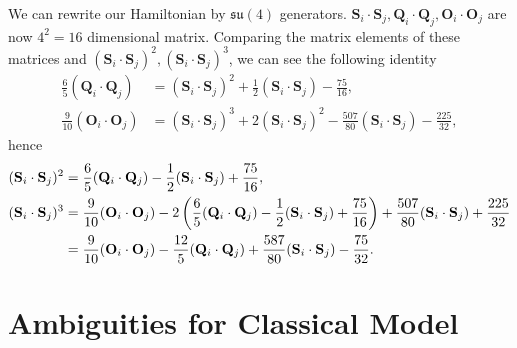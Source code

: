 \documentclass[11pt, aps, longbibliography]{article}
\begin{document}
        We can rewrite our Hamiltonian by $\mathfrak{su}(4)$ generators. $\mathbf{S}_i \cdot \mathbf{S}_j, \mathbf{Q}_i \cdot \mathbf{Q}_j, \mathbf{O}_i \cdot \mathbf{O}_j$ are now $4^2=16$ dimensional matrix. 
        Comparing the matrix elements of these matrices and $(\mathbf{S}_i \cdot \mathbf{S}_j)^2, (\mathbf{S}_i \cdot \mathbf{S}_j)^3$, we can see the following identity
        \begin{align}
            \frac{6}{5}(\mathbf{Q}_i \cdot \mathbf{Q}_j) &= (\mathbf{S}_i \cdot \mathbf{S}_j)^2 + \frac{1}{2}(\mathbf{S}_i \cdot \mathbf{S}_j) - \frac{75}{16}, \\
            \frac{9}{10}(\mathbf{O}_i \cdot \mathbf{O}_j) &= (\mathbf{S}_i \cdot \mathbf{S}_j)^3 + 2(\mathbf{S}_i \cdot \mathbf{S}_j)^2 - \frac{507}{80}(\mathbf{S}_i \cdot \mathbf{S}_j) - \frac{225}{32},
        \end{align}
        hence
        \begin{align}
            (\mathbf{S}_i \cdot \mathbf{S}_j)^2 &= \frac{6}{5}(\mathbf{Q}_i \cdot \mathbf{Q}_j) - \frac{1}{2}(\mathbf{S}_i \cdot \mathbf{S}_j) + \frac{75}{16}, \\
            (\mathbf{S}_i \cdot \mathbf{S}_j)^3 &= \frac{9}{10}(\mathbf{O}_i \cdot \mathbf{O}_j) - 2\left( \frac{6}{5}(\mathbf{Q}_i \cdot \mathbf{Q}_j) - \frac{1}{2}(\mathbf{S}_i \cdot \mathbf{S}_j) + \frac{75}{16} \right) + \frac{507}{80}(\mathbf{S}_i \cdot \mathbf{S}_j) + \frac{225}{32} \notag \\
            &= \frac{9}{10}(\mathbf{O}_i \cdot \mathbf{O}_j) - \frac{12}{5}(\mathbf{Q}_i \cdot \mathbf{Q}_j) + \frac{587}{80}(\mathbf{S}_i \cdot \mathbf{S}_j) - \frac{75}{32}.
        \end{align}

\newpage

\section{Ambiguities for Classical Model}
\end{document}
